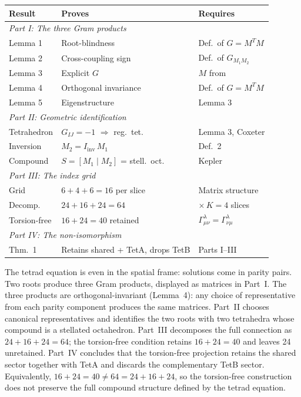 \documentclass[twocolumn]{iopjournal}
\theoremstyle{definition}
\begin{document}
\vspace{6pt}
\noindent
{\footnotesize
\begin{tabular*}{\columnwidth}{@{\extracolsep{\fill}}lll@{}}
\hline
Result & Proves & Requires \\
\hline
\multicolumn{3}{l}{\textit{Part I: The three Gram products}} \\
Lemma 1 & Root-blindness & Def.\ of $G = M^T M$ \\
Lemma 2 & Cross-coupling sign & Def.\ of $G_{M_1 M_2}$ \\
Lemma 3 & Explicit $G$ & $M$ from~\cite{Nelson2026a} \\
Lemma 4 & Orthogonal invariance & Def.\ of $G = M^T M$ \\
Lemma 5 & Eigenstructure & Lemma 3 \\[4pt]
\multicolumn{3}{l}{\textit{Part II: Geometric identification}} \\
Tetrahedron & $G_{IJ} = -1$ $\Rightarrow$ reg.\ tet. & Lemma 3, Coxeter \\
Inversion & $M_2 = I_{\mathrm{inv}}\,M_1$ & Def.\ 2 \\
Compound & $S = [M_1 \mid M_2]$ = stell.\ oct. & Kepler~\cite{Kepler1619} \\[4pt]
\multicolumn{3}{l}{\textit{Part III: The index grid}} \\
Grid & $6 + 4 + 6 = 16$ per slice & Matrix structure \\
Decomp. & $24 + 16 + 24 = 64$ & $\times\,K = 4$ slices \\
Torsion-free & $16 + 24 = 40$ retained & $\Gamma^\lambda_{\mu\nu} = \Gamma^\lambda_{\nu\mu}$ \\[4pt]
\multicolumn{3}{l}{\textit{Part IV: The non-isomorphism}} \\
Thm.\ 1 & Retains shared + TetA, drops TetB & Parts I--III \\
\hline
\end{tabular*}}
\vspace{6pt}

\noindent
The tetrad equation is even in the spatial frame: solutions come in
parity pairs.  Two roots produce three Gram products, displayed as
matrices in Part~I.  The three products are orthogonal-invariant
(Lemma~4): any choice of representative from each parity component
produces the same matrices.  Part~II chooses canonical representatives
and identifies the two roots with two tetrahedra whose compound is a
stellated octahedron.  Part~III decomposes the full connection as
$24 + 16 + 24 = 64$; the torsion-free condition retains $16 + 24 = 40$
and leaves 24 unretained.
Part~IV concludes that the torsion-free projection retains the shared
sector together with TetA and discards the complementary TetB sector.
Equivalently, $16 + 24 = 40 \neq 64 = 24 + 16 + 24$, so the
torsion-free construction does not preserve the full compound
structure defined by the tetrad equation.
\end{document}
